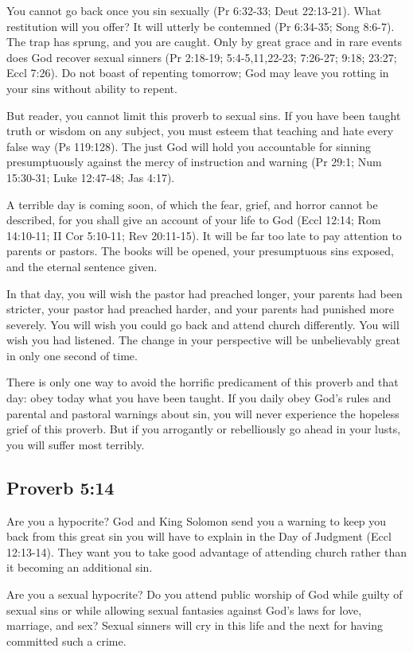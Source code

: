 You cannot go back once you sin sexually (Pr 6:32-33; Deut 22:13-21). What restitution will you offer? It will utterly be contemned (Pr 6:34-35; Song 8:6-7). The trap has sprung, and you are caught. Only by great grace and in rare events does God recover sexual sinners (Pr 2:18-19; 5:4-5,11,22-23; 7:26-27; 9:18; 23:27; Eccl 7:26). Do not boast of repenting tomorrow; God may leave you rotting in your sins without ability to repent.

But reader, you cannot limit this proverb to sexual sins. If you have been taught truth or wisdom on any subject, you must esteem that teaching and hate every false way (Ps 119:128). The just God will hold you accountable for sinning presumptuously against the mercy of instruction and warning (Pr 29:1; Num 15:30-31; Luke 12:47-48; Jas 4:17).

A terrible day is coming soon, of which the fear, grief, and horror cannot be described, for you shall give an account of your life to God (Eccl 12:14; Rom 14:10-11; II Cor 5:10-11; Rev 20:11-15). It will be far too late to pay attention to parents or pastors. The books will be opened, your presumptuous sins exposed, and the eternal sentence given.

In that day, you will wish the pastor had preached longer, your parents had been stricter, your pastor had preached harder, and your parents had punished more severely. You will wish you could go back and attend church differently. You will wish you had listened. The change in your perspective will be unbelievably great in only one second of time. 

There is only one way to avoid the horrific predicament of this proverb and that day: obey today what you have been taught. If you daily obey God’s rules and parental and pastoral warnings about sin, you will never experience the hopeless grief of this proverb. But if you arrogantly or rebelliously go ahead in your lusts, you will suffer most terribly.

\subsection{Proverb 5:14}
Are you a hypocrite? God and King Solomon send you a warning to keep you back from this great sin you will have to explain in the Day of Judgment (Eccl 12:13-14). They want you to take good advantage of attending church rather than it becoming an additional sin.

Are you a sexual hypocrite? Do you attend public worship of God while guilty of sexual sins or while allowing sexual fantasies against God’s laws for love, marriage, and sex? Sexual sinners will cry in this life and the next for having committed such a crime.

